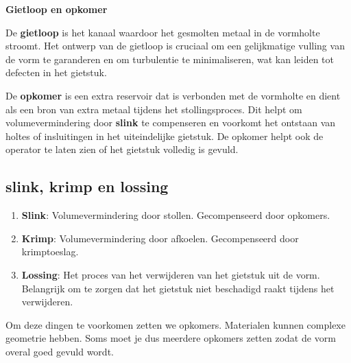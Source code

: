 \documentclass[a4paper,12pt,twoside]{report}
\begin{document}
\begin{conceptbox}
	\textbf{Gietloop en opkomer}

	De \textbf{gietloop} is het kanaal waardoor het gesmolten metaal in de vormholte stroomt.
	Het ontwerp van de gietloop is cruciaal om een gelijkmatige vulling van de vorm te garanderen en om turbulentie te minimaliseren, wat kan leiden tot defecten in het gietstuk.

	De \textbf{opkomer} is een extra reservoir dat is verbonden met de vormholte en dient als een bron van extra metaal tijdens het stollingsproces.
	Dit helpt om volumevermindering door \textbf{slink} te compenseren en voorkomt het ontstaan van holtes of insluitingen in het uiteindelijke gietstuk.
	De opkomer helpt ook de operator te laten zien of het gietstuk volledig is gevuld.
\end{conceptbox}

\subsection{slink, krimp en lossing}
\begin{conceptbox}
	\begin{enumerate}
		\item \textbf{Slink}: Volumevermindering door stollen. Gecompenseerd door opkomers.
		\item \textbf{Krimp}: Volumevermindering door afkoelen. Gecompenseerd door krimptoeslag.
		\item \textbf{Lossing}: Het proces van het verwijderen van het gietstuk uit de vorm.
		      Belangrijk om te zorgen dat het gietstuk niet beschadigd raakt tijdens het verwijderen.
	\end{enumerate}
\end{conceptbox}

Om deze dingen te voorkomen zetten we opkomers. Materialen kunnen complexe geometrie hebben. 
Soms moet je dus meerdere opkomers zetten zodat de vorm overal goed gevuld wordt.
\end{document}
